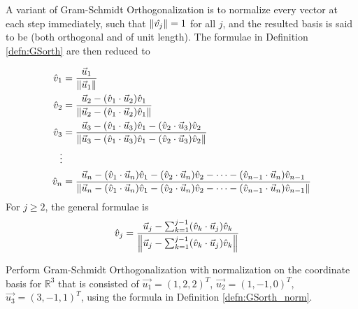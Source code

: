 A variant of Gram-Schmidt Orthogonalization is to normalize every vector at each step immediately, such that $\norm{\hat{v_j}} = 1$ for all $j$, and the resulted basis is said to be  (both orthogonal and of unit length). The formulae in Definition \ref{defn:GSorth} are then reduced to
\begin{defn}
\label{defn:GSorth_norm}
\begin{align*}
\hat{v}_1 &= \frac{\vec{u}_1}{\norm{\vec{u}_1}} \\
\hat{v}_2 &= \frac{\vec{u}_2 - (\hat{v}_1 \cdot \vec{u}_2)\hat{v}_1}{\norm{\vec{u}_2 - (\hat{v}_1 \cdot \vec{u}_2)\hat{v}_1}} \\
\hat{v}_3 &= \frac{\vec{u}_3 - (\hat{v}_1 \cdot \vec{u}_3)\hat{v}_1 - (\hat{v}_2 \cdot \vec{u}_3)\hat{v}_2}{\norm{\vec{u}_3 - (\hat{v}_1 \cdot \vec{u}_3)\hat{v}_1 - (\hat{v}_2 \cdot \vec{u}_3)\hat{v}_2}} \\
\vdots \\
\hat{v}_n &= \frac{\vec{u}_n - (\hat{v}_1 \cdot \vec{u}_n)\hat{v}_1 - (\hat{v}_2 \cdot \vec{u}_n)\hat{v}_2 - \cdots - (\hat{v}_{n-1} \cdot \vec{u}_n)\hat{v}_{n-1}}{\norm{\vec{u}_n - (\hat{v}_1 \cdot \vec{u}_n)\hat{v}_1 - (\hat{v}_2 \cdot \vec{u}_n)\hat{v}_2 - \cdots - (\hat{v}_{n-1} \cdot \vec{u}_n)\hat{v}_{n-1}}} 
\end{align*}
For $j \geq 2$, the general formulae is
\begin{align*}
\hat{v}_j &= \frac{\vec{u}_j - \sum_{k=1}^{j-1}(\hat{v}_k \cdot \vec{u}_j)\hat{v}_k}{\norm{\vec{u}_j - \sum_{k=1}^{j-1}(\hat{v}_k \cdot \vec{u}_j)\hat{v}_k}}
\end{align*}
\end{defn}
\begin{exmp}
\label{exmp:GS_ex}
Perform Gram-Schmidt Orthogonalization with normalization on the coordinate basis for $\mathbb{R}^3$ that is consisted of $\vec{u_1} = (1,2,2)^T$, $\vec{u_2} = (1,-1,0)^T$, $\vec{u_3} = (3,-1,1)^T$, using the formula in Definition \ref{defn:GSorth_norm}.
\end{exmp}
